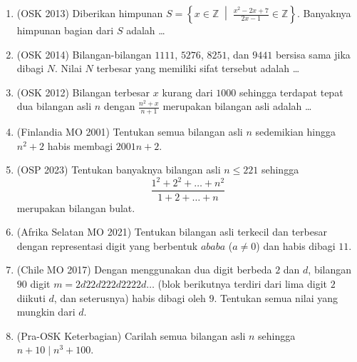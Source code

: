 \documentclass[12pt]{scrartcl}
\begin{document}
\begin{enumerate}
	\item (OSK 2013)
	Diberikan himpunan $S = \left\{x \in \mathbb{Z} \;\middle|\; \frac{x^2 - 2x + 7}{2x - 1} \in \mathbb{Z}\right\}$.
	Banyaknya himpunan bagian dari $S$ adalah \dots

	\item (OSK 2014)
	Bilangan-bilangan $1111$, $5276$, $8251$, dan $9441$ bersisa sama jika dibagi $N$.
	Nilai $N$ terbesar yang memiliki sifat tersebut adalah \dots

	\item (OSK 2012)
	Bilangan terbesar $x$ kurang dari $1000$ sehingga terdapat tepat dua bilangan asli $n$
	dengan $\frac{n^2 + x}{n + 1}$ merupakan bilangan asli adalah \dots

	\item (Finlandia MO 2001)
	Tentukan semua bilangan asli $n$ sedemikian hingga $n^2 + 2$ habis membagi $2001n + 2$.

	\item (OSP 2023)
	Tentukan banyaknya bilangan asli $n \le 221$ sehingga
	\[ \frac{1^2 + 2^2 + \dots + n^2}{1 + 2 + \dots + n} \]
	merupakan bilangan bulat.

	\item (Afrika Selatan MO 2021)
	Tentukan bilangan asli terkecil dan terbesar dengan representasi digit
	yang berbentuk $ababa$ ($a \ne 0$) dan habis dibagi $11$.

	\item (Chile MO 2017)
	Dengan menggunakan dua digit berbeda $2$ dan $d$,
	bilangan $90$ digit $m = 2d22d222d2222d\ldots$ (blok berikutnya terdiri dari
	lima digit $2$ diikuti $d$, dan seterusnya) habis dibagi oleh $9$.
	Tentukan semua nilai yang mungkin dari $d$.

	\item (Pra-OSK Keterbagian)
	Carilah semua bilangan asli $n$ sehingga $n + 10 \mid n^3 + 100$.


\end{enumerate}
\end{document}
